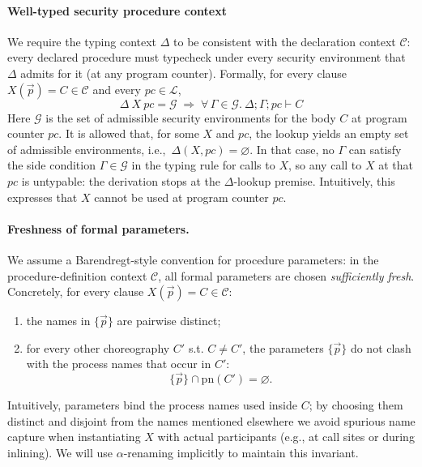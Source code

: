 \documentclass[12pt,a4paper,twoside]{book}
\newcommand{\pn}{\mathrm{pn}}
\begin{document}
\paragraph{Well-typed security procedure context}
We require the typing context \(\Delta\) to be consistent with the declaration context \(\mathscr{C}\): every declared procedure must typecheck under every security environment that \(\Delta\) admits for it (at any program counter). Formally, for every clause \(X(\vec{p}) = C \in \mathscr{C}\) and every \(pc \in \mathscr{L}\),
\begin{equation}\label{ass:wellt_ctx}
  \Delta~X~pc = \mathcal{G}
  \;\Longrightarrow\;
  \forall\,\Gamma \in \mathcal{G}.\ \Delta;\Gamma;pc \vdash C
\end{equation}
Here \(\mathcal{G}\) is the set of admissible security environments for the body \(C\) at program counter \(pc\).
It is allowed that, for some \(X\) and \(pc\), the lookup yields an empty set of admissible environments, i.e.,\ \(\Delta(X,pc)=\varnothing\).
In that case, no \(\Gamma\) can satisfy the side condition \(\Gamma \in \mathcal{G}\) in the typing rule for calls to \(X\), so any call to \(X\) at that \(pc\) is untypable: the derivation stops at the \(\Delta\)-lookup premise. Intuitively, this expresses that \(X\) cannot be used at program counter \(pc\).

\paragraph{Freshness of formal parameters.}
\label{ass:fresh}
We assume a Barendregt-style convention for procedure parameters\cite{barendregt1984lambda}: in the procedure-definition context \(\mathscr{C}\), all formal parameters are chosen \emph{sufficiently fresh}. Concretely, for every clause \(X(\vec{p}) = C \in \mathscr{C}\):
\begin{enumerate}
  \item the names in \(\{\vec{p}\}\) are pairwise distinct;
  \item for every other choreography $C'$ s.t. \(C \neq C'\), the parameters \(\{\vec{p}\}\) do not clash with the process names that occur in \(C'\):
  \[
    \{\vec{p}\} \cap \pn(C') = \varnothing.
  \]
\end{enumerate}
Intuitively, parameters bind the process names used inside \(C\); by choosing them distinct and disjoint from the names mentioned elsewhere we avoid spurious name capture when instantiating \(X\) with actual participants (e.g., at call sites or during inlining). We will use \(\alpha\)-renaming implicitly to maintain this invariant.
\end{document}
